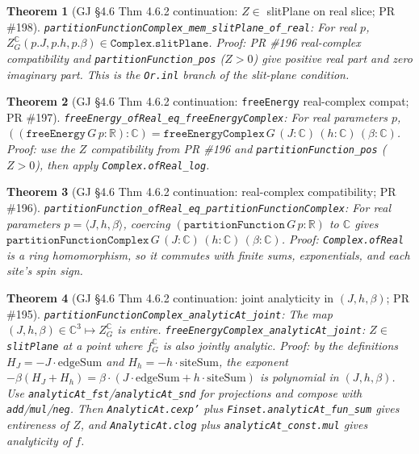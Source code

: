 \documentclass[a4paper,11pt]{article}
\newtheorem{theorem}{Theorem}
\begin{document}
\begin{theorem}[GJ \S 4.6 Thm 4.6.2 continuation: $Z \in$ slitPlane on real slice; PR \#198]
\texttt{partitionFunctionComplex\_mem\_slitPlane\_of\_real}:
For real $p$, $Z^{\mathbb C}_G(p.J, p.h, p.\beta) \in \texttt{Complex.slitPlane}$.
Proof: PR \#196 real-complex compatibility and \texttt{partitionFunction\_pos}
($Z > 0$) give positive real part and zero imaginary part. This is the
\texttt{Or.inl} branch of the slit-plane condition.
\end{theorem}

\begin{theorem}[GJ \S 4.6 Thm 4.6.2 continuation: \texttt{freeEnergy} real-complex compat; PR \#197]
\texttt{freeEnergy\_ofReal\_eq\_freeEnergyComplex}:
For real parameters $p$,
$((\texttt{freeEnergy}\,G\,p : \mathbb R) : \mathbb C) = \texttt{freeEnergyComplex}\,G\,(J:\mathbb C)\,(h:\mathbb C)\,(\beta:\mathbb C)$.
Proof: use the $Z$ compatibility from PR \#196 and
\texttt{partitionFunction\_pos} ($Z > 0$), then apply
\texttt{Complex.ofReal\_log}.
\end{theorem}

\begin{theorem}[GJ \S 4.6 Thm 4.6.2 continuation: real-complex compatibility; PR \#196]
\texttt{partitionFunction\_ofReal\_eq\_partitionFunctionComplex}:
For real parameters $p = \langle J, h, \beta\rangle$, coercing
$(\texttt{partitionFunction}\,G\,p : \mathbb R)$ to $\mathbb C$ gives
$\texttt{partitionFunctionComplex}\,G\,(J:\mathbb C)\,(h:\mathbb C)\,(\beta:\mathbb C)$.
Proof: \texttt{Complex.ofReal} is a ring homomorphism, so it commutes with
finite sums, exponentials, and each site's spin sign.
\end{theorem}

\begin{theorem}[GJ \S 4.6 Thm 4.6.2 continuation: joint analyticity in $(J,h,\beta)$; PR \#195]
\texttt{partitionFunctionComplex\_analyticAt\_joint}:
The map $(J, h, \beta) \in \mathbb C^3 \mapsto Z_G^{\mathbb C}$ is entire.
\texttt{freeEnergyComplex\_analyticAt\_joint}: $Z \in$ \texttt{slitPlane}
at a point where $f_G^{\mathbb C}$ is also jointly analytic.
Proof: by the definitions $H_J = -J \cdot \text{edgeSum}$ and
$H_h = -h \cdot \text{siteSum}$, the exponent
$-\beta(H_J + H_h) = \beta \cdot (J \cdot \text{edgeSum} + h \cdot \text{siteSum})$
is polynomial in $(J, h, \beta)$. Use
\texttt{analyticAt\_fst}/\texttt{analyticAt\_snd} for projections and compose
with \texttt{add}/\texttt{mul}/\texttt{neg}. Then
\texttt{AnalyticAt.cexp'} plus \texttt{Finset.analyticAt\_fun\_sum} gives
entireness of $Z$, and \texttt{AnalyticAt.clog} plus
\texttt{analyticAt\_const.mul} gives analyticity of $f$.
\end{theorem}
\end{document}

